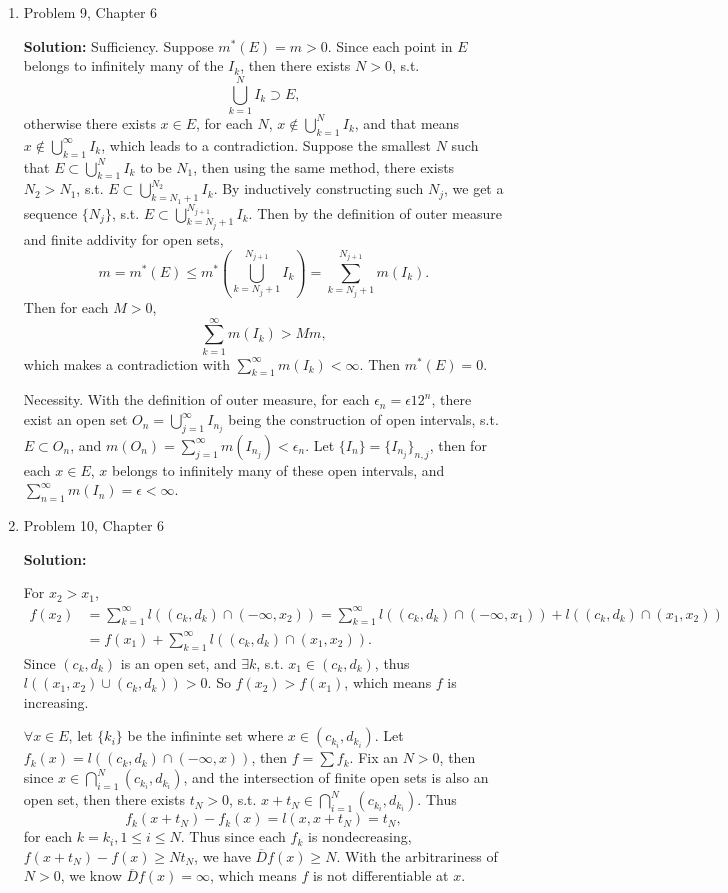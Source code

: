 \documentclass{article}%
\begin{document}
\begin{enumerate}
\item  Problem 9,  Chapter 6 

\smallskip
\textbf{Solution:}
\smallskip
Sufficiency. Suppose $m^*(E) = m > 0$. Since each point in $E$ belongs to infinitely many of the $I_k $, then there exists $N > 0$, s.t. 
$$
\bigcup_{k=1}^N I_k\supset E,
$$
otherwise there exists $x\in E$, for each $N$, $x\notin \bigcup\limits_{k=1}^N I_k $, and that means $x\notin \bigcup\limits_{k=1}^{\infty}I_k $, which leads to a contradiction. Suppose the smallest $N$ such that $E \subset \bigcup\limits_{k=1}^N I_k$ to be $N_1 $, then using the same method, there exists $N_2 > N_1 $, s.t. $E \subset \bigcup\limits_{k=N_1+1}^{N_2} I_k$. By inductively constructing such $N_j $, we get a sequence $\{N_j\}$, s.t. $E \subset \bigcup\limits_{k=N_j+1}^{N_{j+1}} I_k $. Then by the definition of outer measure and finite addivity for open sets, 
$$
m = m^*(E) \le m^*(\bigcup\limits_{k=N_j+1}^{N_{j+1}}I_k) = \sum_{k = N_j+1}^{N_{j+1}}m(I_k).
$$
Then for each $M > 0$,
$$
\sum_{k=1}^{\infty}m(I_k) > Mm, 
$$
which makes a contradiction with $\sum_{k=1}^{\infty}m(I_k) < \infty$. Then $m^*(E) = 0$.

Necessity. With the definition of outer measure, for each $\epsilon_n = \epsilon{1}{2^n} $, there exist an open set $O_n = \bigcup\limits_{j=1}^{\infty}I_{n_j} $ being the construction of open intervals, s.t. $E\subset O_n $, and $m(O_n) = \sum\limits_{j=1}^{\infty}m(I_{n_j}) < \epsilon_n $. Let $\{I_n\} = \{I_{n_j}\}_{n, j} $, then for each $x\in E$, $x$ belongs to infinitely many of these open intervals, and $\sum\limits_{n=1}^{\infty}m(I_n) = \epsilon < \infty$.

\bigskip
\item  Problem 10, Chapter 6

\smallskip
\textbf{Solution:}
\smallskip

For $x_2 > x_1 $, 
$$
\begin{aligned}
f(x_2) &= \sum_{k=1}^{\infty}l((c_k, d_k)\cap (-\infty, x_2)) = \sum_{k=1}^{\infty}l((c_k, d_k)\cap (-\infty, x_1)) + l((c_k, d_k)\cap (x_1, x_2)) \\
&= f(x_1) + \sum_{k=1}^{\infty}l((c_k, d_k)\cap (x_1, x_2)).
\end{aligned}
$$
Since $(c_k, d_k)$ is an open set, and $\exists k$, s.t. $x_1\in(c_k, d_k) $, thus $l((x_1, x_2)\cup (c_k, d_k)) > 0$. So $f(x_2) > f(x_1)$, which means $f$ is increasing.

$\forall x\in E$, let $\{k_i\}$ be the infininte set where $x \in (c_{k_i}, d_{k_i})$. Let $f_k(x) = l((c_k, d_k) \cap (-\infty, x))$, then $f = \sum f_k $. Fix an $N > 0$, then since $x\in\bigcap\limits_{i=1}^{N}(c_{k_i}, d_{k_i}) $, and the intersection of finite open sets is also an open set, then there exists $t_N > 0 $, s.t. $x+t_N \in\bigcap\limits_{i=1}^{N}(c_{k_i}, d_{k_i}) $. Thus 
$$
f_k(x+t_N)-f_k(x) = l(x, x+t_N) = t_N,
$$
for each $k = k_i, 1\le i\le N$. Thus since each $f_k$ is nondecreasing, $f(x+t_N) - f(x) \ge Nt_N$, we have $\overline{D}f(x) \ge N$. With the arbitrariness of $N > 0$, we know $\overline{D}f(x) = \infty$, which means $f$ is not differentiable at $x$.


\end{enumerate}
\end{document}
